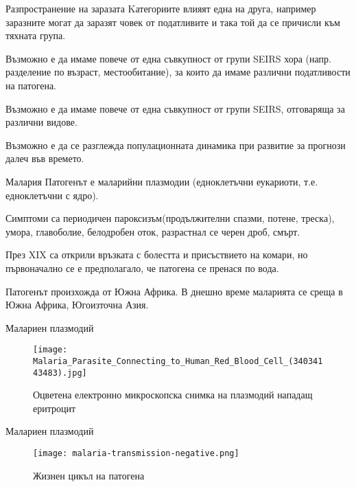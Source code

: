 \begin{frame}[t]{Разпространение на заразата}
  Kатегориите влияят една на друга, например заразните могат да заразят човек от податливите и така той да се причисли към тяхната група.

  Възможно е да имаме повече от една съвкупност от групи SEIRS хора (напр. разделение по възраст, местообитание), за които да имаме различни податливости на патогена.

  Възможно е да имаме повече от една съвкупност от групи SEIRS, отговаряща за различни видове.

  Възможно е да се разглежда популационната динамика при развитие за прогнози далеч във времето.
\end{frame}

\begin{frame}[t]{Малария}
  Патогенът е маларийни плазмодии (едноклетъчни еукариоти, т.е. едноклетъчни с ядро).

  Симптоми са периодичен пароксизъм(продължителни спазми, потене, треска), умора, главоболие, белодробен оток, разрастнал се черен дроб, смърт.

  През XIX са открили връзката с болестта и присъствието на комари, но първоначално се е предполагало, че патогена се пренася по вода.

  Патогенът произхожда от Южна Африка.
  В днешно време маларията се среща в Южна Африка, Югоизточна Азия.
\end{frame}

\begin{frame}[t]{Малариен плазмодий}
  \begin{figure}
    \texttt{[image: Malaria\_Parasite\_Connecting\_to\_Human\_Red\_Blood\_Cell\_(34034143483).jpg]}
    \centering
    \caption{Оцветена електронно микроскопска снимка на плазмодий нападащ еритроцит}
  \end{figure}
\end{frame}

\begin{frame}[t]{Малариен плазмодий}
  \begin{figure}
    \texttt{[image: malaria-transmission-negative.png]}
    \centering
    \caption{Жизнен цикъл на патогена}
  \end{figure}
\end{frame}
